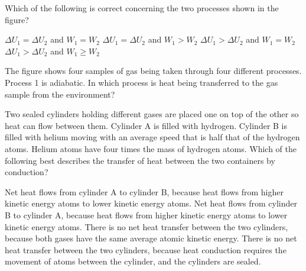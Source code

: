 \documentclass{../../../oss-ap12ibhl}
\begin{document}
\begin{questions}
  \question Which of the following is correct concerning the two processes shown
  in the figure?
  
  \begin{minipage}{.35\textwidth}
  \end{minipage}
  \begin{minipage}{.4\textwidth}
    \begin{choices}
      \choice $\Delta U_1 = \Delta U_2$ and $W_1= W_2$
      \choice $\Delta U_1 = \Delta U_2$ and $W_1>W_2$
      \choice $\Delta U_1 > \Delta U_2$ and $W_1=W_2$
      \choice $\Delta U_1 > \Delta U_2$ and $W_1\geq W_2$
    \end{choices}
  \end{minipage}
  
  \question The figure shows four samples of gas being taken through four
  different processes. Process 1 is adiabatic. In which process is heat being
  transferred to the gas sample from the environment?

  \begin{minipage}{.35\textwidth}
  \end{minipage}
  \begin{minipage}{.2\textwidth}
    \begin{choices}
    \end{choices}
  \end{minipage}
    
  \question Two sealed cylinders holding different gases are placed one on top
  of the other so heat can flow between them. Cylinder A is filled with
  hydrogen. Cylinder B is filled with helium moving with an average speed that
  is half that of the hydrogen atoms. Helium atoms have four times the mass of
  hydrogen atoms. Which of the following best describes the transfer of heat
  between the two containers by conduction?
  \begin{choices}
    \choice Net heat flows from cylinder A to cylinder B, because heat flows
    from higher kinetic energy atoms to lower kinetic energy atoms.
    \choice Net heat flows from cylinder B to cylinder A, because heat flows
    from higher kinetic energy atoms to lower kinetic energy atoms.
    \choice There is no net heat transfer between the two cylinders, because
    both gases have the same average atomic kinetic energy.
    \choice There is no net heat transfer between the two cylinders, because
    heat conduction requires the movement of atoms between the cylinder, and the
    cylinders are sealed.
  \end{choices}
  

\end{questions}
\end{document}
